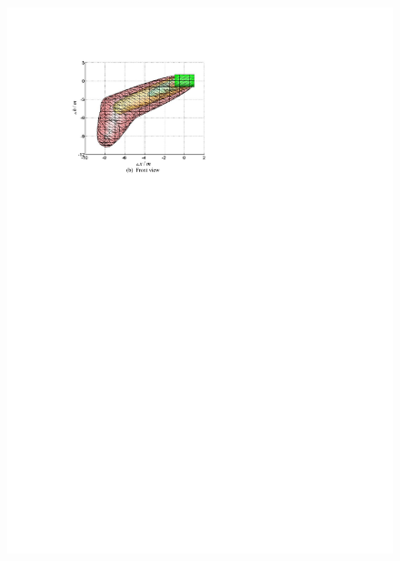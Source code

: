 \begin{figure}[h]
\begin{minipage}{0.45\linewidth}
		\includegraphics[width=0.9\linewidth]{Figures/Figs_Ch13/Fig7_2}
	\end{minipage}	
	\begin{minipage}{0.45\linewidth}
		\centering

\end{minipage}
\end{figure}
